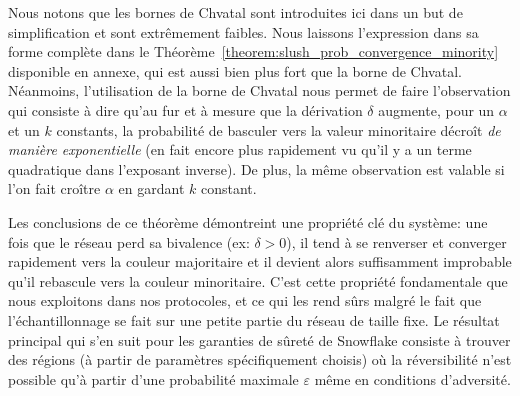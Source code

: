 \documentclass[letterpaper,twocolumn,10pt]{article}
\theoremstyle{definition}
\begin{document}

Nous notons que les bornes de Chvatal sont introduites ici dans un but de simplification et sont extrêmement faibles.
Nous laissons l'expression dans sa forme complète dans le Théorème~\ref{theorem:slush_prob_convergence_minority}
disponible en annexe, qui est aussi bien plus fort que la borne de Chvatal.
Néanmoins, l'utilisation de la borne de Chvatal nous permet de faire l'observation qui consiste à dire qu'au fur et à
mesure que la dérivation $\delta$ augmente, pour un $\alpha$ et un $k$ constants, la probabilité de basculer vers la
valeur minoritaire décroît \emph{de manière exponentielle} (en fait encore plus rapidement vu qu'il y a un terme
quadratique dans l'exposant inverse). De plus, la même observation est valable si l'on fait croître $\alpha$ en gardant
$k$ constant.

Les conclusions de ce théorème démontreint une propriété clé du système: une fois que le réseau perd sa bivalence
(ex: $\delta > 0$), il tend à se renverser et converger rapidement vers la couleur majoritaire et il devient alors
suffisamment improbable qu'il rebascule vers la couleur minoritaire. C'est cette propriété fondamentale que nous
exploitons dans nos protocoles, et ce qui les rend sûrs malgré le fait que l'échantillonnage se fait sur une petite
partie du réseau de taille fixe. Le résultat principal qui s'en suit pour les garanties de sûreté de Snowflake consiste
à trouver des régions (à partir de paramètres spécifiquement choisis) où la réversibilité n'est possible qu'à partir
d'une probabilité maximale $\varepsilon$ même en conditions d'adversité.

\end{document}
